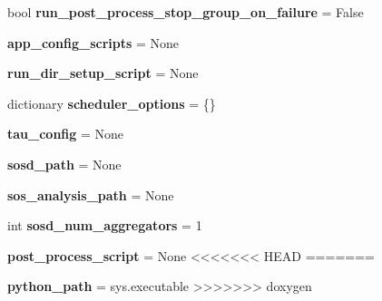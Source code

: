 \begin{DoxyCompactItemize}
bool {\bfseries run\+\_\+post\+\_\+process\+\_\+stop\+\_\+group\+\_\+on\+\_\+failure} = False
\item 
\mbox{\label{classcodar_1_1cheetah_1_1model_1_1_campaign_a434f06408e6b364e0efc232fa107eb33}} 
{\bfseries app\+\_\+config\+\_\+scripts} = None
\item 
\mbox{\label{classcodar_1_1cheetah_1_1model_1_1_campaign_aa7d421cedfa8ffb615f6fd8f38b208ef}} 
{\bfseries run\+\_\+dir\+\_\+setup\+\_\+script} = None
\item 
\mbox{\label{classcodar_1_1cheetah_1_1model_1_1_campaign_a6c58ab5dac64e6ab4796c6e6de6347c7}} 
dictionary {\bfseries scheduler\+\_\+options} = \{\}
\item 
\mbox{\label{classcodar_1_1cheetah_1_1model_1_1_campaign_a28e44a6ede93e17d40627bd9a31fa8d3}} 
{\bfseries tau\+\_\+config} = None
\item 
\mbox{\label{classcodar_1_1cheetah_1_1model_1_1_campaign_af655e512e1d8b7a3bd5104d890dab023}} 
{\bfseries sosd\+\_\+path} = None
\item 
\mbox{\label{classcodar_1_1cheetah_1_1model_1_1_campaign_a521eea7dac8df14f3ea9174cd6297340}} 
{\bfseries sos\+\_\+analysis\+\_\+path} = None
\item 
\mbox{\label{classcodar_1_1cheetah_1_1model_1_1_campaign_a8cdebf43b605e4ac036fbf4e0b9e7d15}} 
int {\bfseries sosd\+\_\+num\+\_\+aggregators} = 1
\item 
\mbox{\label{classcodar_1_1cheetah_1_1model_1_1_campaign_a7452ae0f9b6946a5e531cf6bebd55179}} 
{\bfseries post\+\_\+process\+\_\+script} = None
<<<<<<< HEAD
=======
\item 
\mbox{\label{classcodar_1_1cheetah_1_1model_1_1_campaign_af71218dfabb60e7f23997a0a8f1e1158}} 
{\bfseries python\+\_\+path} = sys.\+executable
>>>>>>> doxygen
\end{DoxyCompactItemize}


